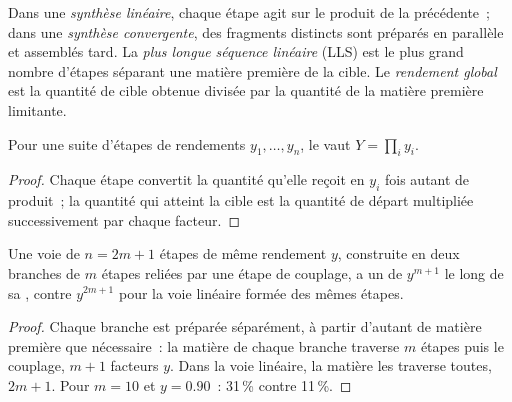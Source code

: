 \begin{definition}\label{def:b3:total-synthesis:architecture}
Dans une \emph{synthèse linéaire}, chaque étape agit sur
le produit de la précédente~; dans une \emph{synthèse convergente},
des fragments distincts sont préparés en parallèle et assemblés tard. La
\emph{plus longue séquence linéaire} (LLS) est le plus grand
nombre d'étapes séparant une matière première de la cible. Le
\emph{rendement global} est la quantité de cible
obtenue divisée par la quantité de la matière première limitante.
\end{definition}

\begin{proposition}\label{prop:b3:total-synthesis:overall-yield}
Pour une suite d'étapes de rendements $y_1, \dots, y_n$, le  vaut $Y = \prod_i y_i$.
\end{proposition}

\begin{proof}
Chaque étape convertit la quantité qu'elle reçoit en $y_i$ fois autant de produit~; la
quantité qui atteint la cible est la quantité de départ multipliée
successivement par chaque facteur.
\end{proof}

\begin{proposition}[Convergence]\label{prop:b3:total-synthesis:convergent}
Une voie de $n = 2m + 1$ étapes de même rendement $y$, construite en deux branches de $m$ étapes reliées par
une étape de couplage, a un  de $y^{m+1}$ le long de sa ,
contre $y^{2m+1}$ pour la voie linéaire formée des mêmes étapes.
\end{proposition}

\begin{proof}
Chaque branche est préparée séparément, à partir d'autant de matière
première que nécessaire~: la matière de chaque branche traverse $m$ étapes puis le couplage, $m + 1$
facteurs $y$. Dans la voie linéaire, la matière les traverse toutes, $2m + 1$. Pour $m = 10$
et $y = 0.90$~: 31\,\% contre 11\,\%.
\end{proof}

